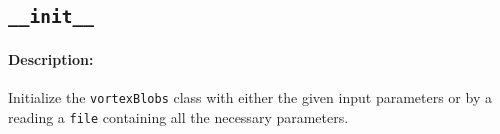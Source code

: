 
\newpage



\subsection{\texttt{\_\_init\_\_}}
	\paragraph{Description:} Initialize the \texttt{vortexBlobs} class with either the given input parameters or by a reading a \texttt{file} containing all the necessary parameters.\\
	
